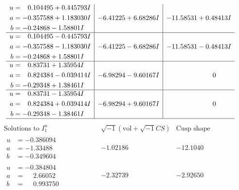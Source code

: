 \documentclass[1p]{elsarticle_modified}
\theoremstyle{definition}
\newcommand{\I}{\sqrt{-1}}
\begin{document}
$$\begin{array}{c|c|c}
\begin{aligned}
u &= \phantom{-}0.104495 + 0.445793 I \\
a &= -0.357588 + 1.183030 I \\
b &= -0.24868 - 1.58801 I\end{aligned}
 & -6.41225 + 6.68286 I & -11.58531 + 0.48413 I \\ \hline\begin{aligned}
u &= \phantom{-}0.104495 - 0.445793 I \\
a &= -0.357588 - 1.183030 I \\
b &= -0.24868 + 1.58801 I\end{aligned}
 & -6.41225 - 6.68286 I & -11.58531 - 0.48413 I \\ \hline\begin{aligned}
u &= \phantom{-}0.83731 + 1.35954 I \\
a &= \phantom{-}0.824384 - 0.039414 I \\
b &= -0.29348 + 1.38461 I\end{aligned}
 & -6.98294 - 9.60167 I & \phantom{-0.000000 } 0 \\ \hline\begin{aligned}
u &= \phantom{-}0.83731 - 1.35954 I \\
a &= \phantom{-}0.824384 + 0.039414 I \\
b &= -0.29348 - 1.38461 I\end{aligned}
 & -6.98294 + 9.60167 I & \phantom{-0.000000 } 0\\
 \hline 
 \end{array}$$\newpage$$\begin{array}{c|c|c}  
\text{Solutions to }I^u_{1}& \I (\text{vol} + \sqrt{-1}CS) & \text{Cusp shape}\\
 \hline 
\begin{aligned}
u &= -0.386094\phantom{ +0.000000I} \\
a &= -1.33488\phantom{ +0.000000I} \\
b &= -0.349604\phantom{ +0.000000I}\end{aligned}
 & -1.02186\phantom{ +0.000000I} & -12.1040\phantom{ +0.000000I} \\ \hline\begin{aligned}
u &= -0.384804\phantom{ +0.000000I} \\
a &= \phantom{-}2.66052\phantom{ +0.000000I} \\
b &= \phantom{-}0.993750\phantom{ +0.000000I}\end{aligned}
 & -2.32739\phantom{ +0.000000I} & -2.92650\phantom{ +0.000000I} \\ \hline\begin{aligned}

\end{aligned}
\end{array}$$
\end{document}
